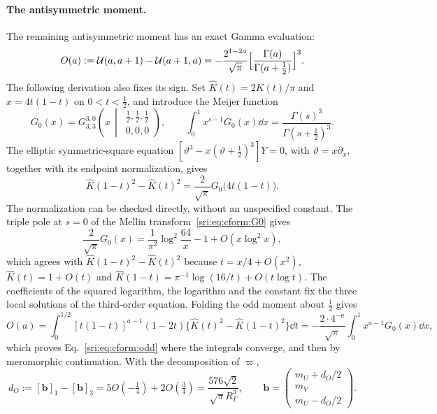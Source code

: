 \paragraph{The antisymmetric moment.} The remaining antisymmetric moment has an exact Gamma evaluation:
\begin{equation}
 O(a):=\mathcal U(a,a+1)-\mathcal U(a+1,a)=-\frac{2^{1-2a}}{\sqrt\pi}\Bigl[\frac{\Gamma(a)}{\Gamma(a+\frac12)}\Bigr]^3.
 \label{sri:eq:cform:odd}
\end{equation}
The following derivation also fixes its sign. Set $\hat K(t)=2K(t)/\pi$ and $x=4t(1-t)$ on $0<t<\frac12$, and
introduce the Meijer function
\begin{equation}
 G_0(x)=G^{3,0}_{3,3}\!\left(x\,\middle|\,\begin{matrix}\frac12,\frac12,\frac12\\0,0,0\end{matrix}\right),\qquad
 \int_0^1x^{s-1}G_0(x)\dd x=\frac{\Gamma(s)^3}{\Gamma(s+\frac12)^3}.
 \label{sri:eq:cform:G0}
\end{equation}
The elliptic symmetric-square equation $[\vartheta^3-x(\vartheta+\frac12)^3]Y=0$, with $\vartheta=x\partial_x$, together
with its endpoint normalization, gives
\begin{equation}
 \hat K(1-t)^2-\hat K(t)^2=\frac2{\sqrt\pi}G_0\bigl(4t(1-t)\bigr).
 \label{sri:eq:cform:compdiff}
\end{equation}
The normalization can be checked directly, without an unspecified constant. The triple pole at $s=0$ of the Mellin
transform~\eqref{sri:eq:cform:G0} gives
\begin{equation}
 \frac2{\sqrt\pi}G_0(x)=\frac1{\pi^2}\log^2\frac{64}{x}-1+O(x\log^2x),
\end{equation}
which agrees with $\hat K(1-t)^2-\hat K(t)^2$ because $t=x/4+O(x^2)$, $\hat K(t)=1+O(t)$ and
$\hat K(1-t)=\pi^{-1}\log(16/t)+O(t\log t)$. The coefficients of the squared logarithm, the logarithm and the constant
fix the three local solutions of the third-order equation. Folding the odd moment about $\frac12$ gives
\begin{equation}
 O(a)=\int_0^{1/2}[t(1-t)]^{a-1}(1-2t)\bigl\{\hat K(t)^2-\hat K(1-t)^2\bigr\}\dd t
 =-\frac{2\cdot4^{-a}}{\sqrt\pi}\int_0^1x^{a-1}G_0(x)\dd x,
\end{equation}
which proves Eq.~\eqref{sri:eq:cform:odd} where the integrals converge, and then by meromorphic continuation. With the
decomposition of $\varpi$,
\begin{equation}
 d_O:=[\mathbf b]_1-[\mathbf b]_3=5O(-\tfrac14)+2O(\tfrac34)=\frac{576\sqrt2}{\sqrt\pi R_\Gamma^3},\qquad
 \mathbf b=\begin{pmatrix}m_U+d_O/2\\m_V\\m_U-d_O/2\end{pmatrix}.
\end{equation}
